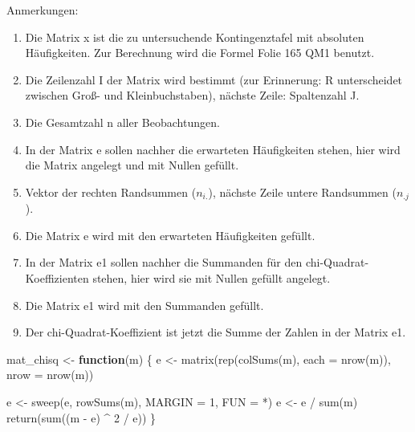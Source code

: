 \documentclass[
]{book}
\newenvironment{Shaded}{\begin{snugshade}}{\end{snugshade}}
\newcommand{\AttributeTok}[1]{\textcolor[rgb]{0.77,0.63,0.00}{#1}}
\newcommand{\ControlFlowTok}[1]{\textcolor[rgb]{0.13,0.29,0.53}{\textbf{#1}}}
\newcommand{\DecValTok}[1]{\textcolor[rgb]{0.00,0.00,0.81}{#1}}
\newcommand{\FunctionTok}[1]{\textcolor[rgb]{0.00,0.00,0.00}{#1}}
\newcommand{\NormalTok}[1]{#1}
\newcommand{\OtherTok}[1]{\textcolor[rgb]{0.56,0.35,0.01}{#1}}
\newcommand{\SpecialCharTok}[1]{\textcolor[rgb]{0.00,0.00,0.00}{#1}}
\newcommand{\StringTok}[1]{\textcolor[rgb]{0.31,0.60,0.02}{#1}}
\begin{document}
Anmerkungen:

\begin{enumerate}
\def\labelenumi{(\arabic{enumi})}
\item
  Die Matrix x ist die zu untersuchende Kontingenztafel mit absoluten Häufigkeiten. Zur Berechnung wird die Formel Folie 165 QM1 benutzt.
\item
  Die Zeilenzahl I der Matrix wird bestimmt (zur Erinnerung: R unterscheidet zwischen Groß- und Kleinbuchstaben), nächste Zeile: Spaltenzahl J.
\item
  Die Gesamtzahl n aller Beobachtungen.
\item
  In der Matrix e sollen nachher die erwarteten Häufigkeiten stehen, hier wird die Matrix angelegt und mit Nullen gefüllt.
\item
  Vektor der rechten Randsummen (\(n_{i.}\)), nächste Zeile untere Randsummen (\(n_{.j}\)).
\item
  Die Matrix e wird mit den erwarteten Häufigkeiten gefüllt.
\item
  In der Matrix e1 sollen nachher die Summanden für den chi-Quadrat-Koeffizienten stehen, hier wird sie mit Nullen gefüllt angelegt.
\item
  Die Matrix e1 wird mit den Summanden gefüllt.
\item
  Der chi-Quadrat-Koeffizient ist jetzt die Summe der Zahlen in der Matrix e1.
\end{enumerate}

\begin{Shaded}
\begin{Highlighting}[numbers=left,,]
\NormalTok{mat\_chisq }\OtherTok{\textless{}{-}} \ControlFlowTok{function}\NormalTok{(m) \{}
\NormalTok{  e }\OtherTok{\textless{}{-}} \FunctionTok{matrix}\NormalTok{(}\FunctionTok{rep}\NormalTok{(}\FunctionTok{colSums}\NormalTok{(m),   }
                  \AttributeTok{each =} \FunctionTok{nrow}\NormalTok{(m)),}
              \AttributeTok{nrow =} \FunctionTok{nrow}\NormalTok{(m))}
  
\NormalTok{  e }\OtherTok{\textless{}{-}} \FunctionTok{sweep}\NormalTok{(e, }
             \FunctionTok{rowSums}\NormalTok{(m), }
             \AttributeTok{MARGIN =} \DecValTok{1}\NormalTok{, }
             \AttributeTok{FUN =} \StringTok{\textquotesingle{}*\textquotesingle{}}\NormalTok{) }
\NormalTok{  e }\OtherTok{\textless{}{-}}\NormalTok{ e }\SpecialCharTok{/} \FunctionTok{sum}\NormalTok{(m)}
  \FunctionTok{return}\NormalTok{(}\FunctionTok{sum}\NormalTok{((m }\SpecialCharTok{{-}}\NormalTok{ e) }\SpecialCharTok{\^{}} \DecValTok{2} \SpecialCharTok{/}\NormalTok{ e))}
\NormalTok{\}}
\end{Highlighting}
\end{Shaded}
\end{document}
